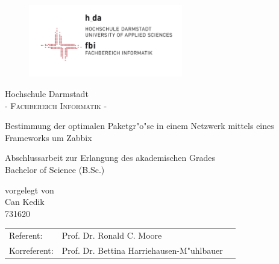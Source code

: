 \pagestyle{empty} %

\begin{figure}[t]
	\centering
	\includegraphics[width=0.6\textwidth]{Abb/logo_fbi}
\end{figure}


\begin{center}
\Large Hochschule Darmstadt \\
\normalsize \textsc{- Fachbereich Informatik -} \\

\vspace{105 pt}

\Huge Bestimmung der optimalen Paketgr"o"se in einem Netzwerk mittels eines Frameworks um Zabbix \\ 
\normalsize
\vspace{20 pt}

Abschlussarbeit zur Erlangung des akademischen Grades \\ 
Bachelor of Science (B.Sc.) 

\vspace{75 pt}


vorgelegt von \\
\vspace{5 pt}
Can Kedik \\
731620
\vspace{115 pt}

\begin{tabular}[h]{p{4cm}l l}
	Referent: & Prof. Dr. Ronald C. Moore\\
	Korreferent: & Prof. Dr. Bettina Harriehausen-M"uhlbauer
\end{tabular}


\end{center}
